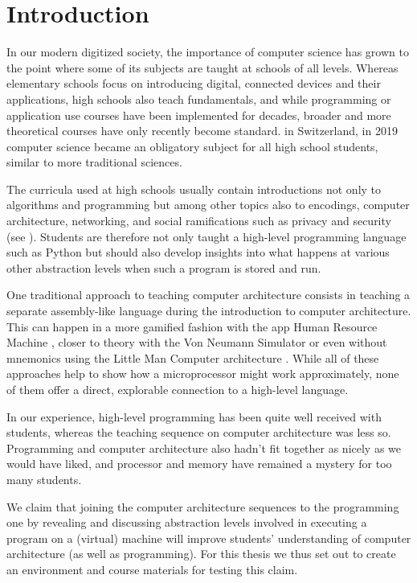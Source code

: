 
\chapter{Introduction}

In our modern digitized society, the importance of computer science has grown to the point where some of its subjects are taught at schools of all levels. Whereas elementary schools focus on introducing digital, connected devices and their applications, high schools also teach fundamentals, and while programming or application use courses have been implemented for decades, broader and more theoretical courses have only recently become standard. \eg in Switzerland, in 2019 computer science became an obligatory subject for all high school students, similar to more traditional sciences.

The curricula used at high schools usually contain introductions not only to algorithms and programming but among other topics also to encodings, computer architecture, networking, and social ramifications such as privacy and security (see \eg \cite{Erz16}). Students are therefore not only taught a high-level programming language such as Python but should also develop insights into what happens at various other abstraction levels when such a program is stored and run.

One traditional approach to teaching computer architecture consists in teaching a separate assembly-like language during the introduction to computer architecture. This can happen in a more gamified fashion \eg with the app Human Resource Machine \cite{Tom15}, closer to theory with the Von Neumann Simulator \cite{Gan23} or even without mnemonics using the Little Man Computer architecture \cite{Oin25}. While all of these approaches help to show how a microprocessor might work approximately, none of them offer a direct, explorable connection to a high-level language.

In our experience, high-level programming has been quite well received with students, whereas the teaching sequence on computer architecture was less so. Programming and computer architecture also hadn't fit together as nicely as we would have liked, and processor and memory have remained a mystery for too many students.

We claim that joining the computer architecture sequences to the programming one by revealing and discussing abstraction levels involved in executing a program on a (virtual) machine will improve students' understanding of computer architecture (as well as programming). For this thesis we thus set out to create an environment and course materials for testing this claim.


